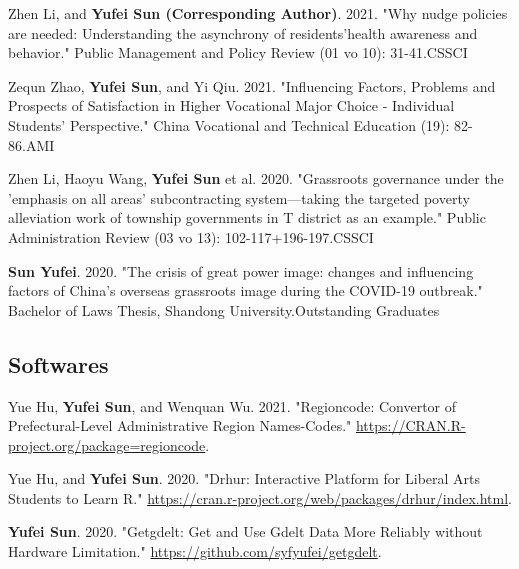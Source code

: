 \documentclass[11pt,a4paper]{article}
\begin{document}
\begin{spacing}{1}
Zhen Li, and \textbf{Yufei Sun (Corresponding Author)}. 2021. "Why nudge policies are needed: Understanding the asynchrony of residents'health awareness and behavior." Public Management and Policy Review (01 vo 10): 31-41.\hfill CSSCI
\end{spacing}

\begin{spacing}{1}
Zequn Zhao, \textbf{Yufei Sun}, and Yi Qiu. 2021. "Influencing Factors, Problems and Prospects of Satisfaction in Higher Vocational Major Choice - Individual Students' Perspective." China Vocational and Technical Education (19): 82-86.\hfill AMI
\end{spacing}

\begin{spacing}{1}
Zhen Li, Haoyu Wang, \textbf{Yufei Sun} et al. 2020. "Grassroots governance under the 'emphasis on all areas' subcontracting system—taking the targeted poverty alleviation work of township governments in T district as an example." Public Administration Review (03 vo 13): 102-117+196-197.\hfill CSSCI
\end{spacing}

\begin{spacing}{1}
\textbf{Sun Yufei}. 2020. "The crisis of great power image: changes and influencing factors of China's overseas grassroots image during the COVID-19 outbreak." Bachelor of Laws Thesis, Shandong University.\hfill Outstanding Graduates
\end{spacing}

\subsection*{Softwares}
\begin{spacing}{1}
Yue Hu, \textbf{Yufei Sun}, and Wenquan Wu. 2021. "Regioncode: Convertor of Prefectural-Level Administrative Region Names-Codes." \url{https://CRAN.R-project.org/package=regioncode}.
\end{spacing}

\begin{spacing}{1}
Yue Hu, and \textbf{Yufei Sun}. 2020. "Drhur: Interactive Platform for Liberal Arts Students to Learn R." \url{https://cran.r-project.org/web/packages/drhur/index.html}.
\end{spacing}

\begin{spacing}{1}
\textbf{Yufei Sun}. 2020. "Getgdelt: Get and Use Gdelt Data More Reliably without Hardware Limitation." \url{https://github.com/syfyufei/getgdelt}.
\end{spacing}
\end{document}
